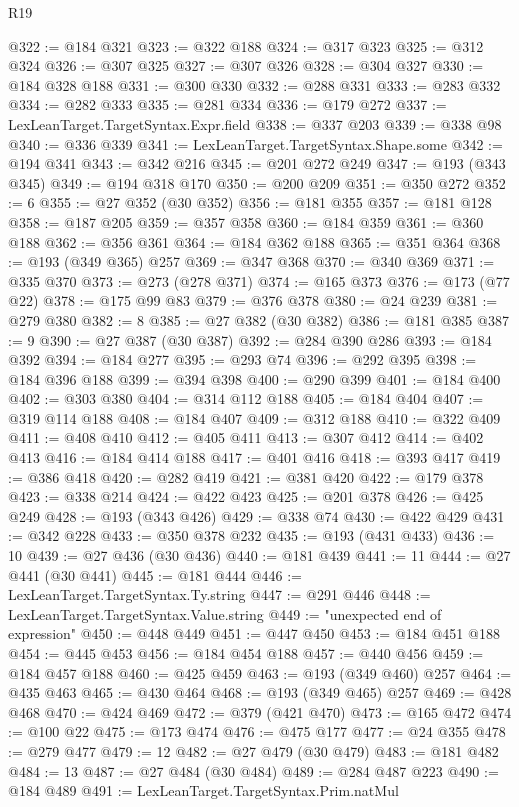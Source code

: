 \begin{lexlean}{R19}
\begin{coremodule}
@322 := @184 @321
@323 := @322 @188
@324 := @317 @323
@325 := @312 @324
@326 := @307 @325
@327 := @307 @326
@328 := @304 @327
@330 := @184 @328 @188
@331 := @300 @330
@332 := @288 @331
@333 := @283 @332
@334 := @282 @333
@335 := @281 @334
@336 := @179 @272
@337 := LexLeanTarget.TargetSyntax.Expr.field
@338 := @337 @203
@339 := @338 @98
@340 := @336 @339
@341 := LexLeanTarget.TargetSyntax.Shape.some
@342 := @194 @341
@343 := @342 @216
@345 := @201 @272 @249
@347 := @193 (@343 @345)
@349 := @194 @318 @170
@350 := @200 @209
@351 := @350 @272
@352 := 6
@355 := @27 @352 (@30 @352)
@356 := @181 @355
@357 := @181 @128
@358 := @187 @205
@359 := @357 @358
@360 := @184 @359
@361 := @360 @188
@362 := @356 @361
@364 := @184 @362 @188
@365 := @351 @364
@368 := @193 (@349 @365) @257
@369 := @347 @368
@370 := @340 @369
@371 := @335 @370
@373 := @273 (@278 @371)
@374 := @165 @373
@376 := @173 (@77 @22)
@378 := @175 @99 @83
@379 := @376 @378
@380 := @24 @239
@381 := @279 @380
@382 := 8
@385 := @27 @382 (@30 @382)
@386 := @181 @385
@387 := 9
@390 := @27 @387 (@30 @387)
@392 := @284 @390 @286
@393 := @184 @392
@394 := @184 @277
@395 := @293 @74
@396 := @292 @395
@398 := @184 @396 @188
@399 := @394 @398
@400 := @290 @399
@401 := @184 @400
@402 := @303 @380
@404 := @314 @112 @188
@405 := @184 @404
@407 := @319 @114 @188
@408 := @184 @407
@409 := @312 @188
@410 := @322 @409
@411 := @408 @410
@412 := @405 @411
@413 := @307 @412
@414 := @402 @413
@416 := @184 @414 @188
@417 := @401 @416
@418 := @393 @417
@419 := @386 @418
@420 := @282 @419
@421 := @381 @420
@422 := @179 @378
@423 := @338 @214
@424 := @422 @423
@425 := @201 @378
@426 := @425 @249
@428 := @193 (@343 @426)
@429 := @338 @74
@430 := @422 @429
@431 := @342 @228
@433 := @350 @378 @232
@435 := @193 (@431 @433)
@436 := 10
@439 := @27 @436 (@30 @436)
@440 := @181 @439
@441 := 11
@444 := @27 @441 (@30 @441)
@445 := @181 @444
@446 := LexLeanTarget.TargetSyntax.Ty.string
@447 := @291 @446
@448 := LexLeanTarget.TargetSyntax.Value.string
@449 := "unexpected end of expression"
@450 := @448 @449
@451 := @447 @450
@453 := @184 @451 @188
@454 := @445 @453
@456 := @184 @454 @188
@457 := @440 @456
@459 := @184 @457 @188
@460 := @425 @459
@463 := @193 (@349 @460) @257
@464 := @435 @463
@465 := @430 @464
@468 := @193 (@349 @465) @257
@469 := @428 @468
@470 := @424 @469
@472 := @379 (@421 @470)
@473 := @165 @472
@474 := @100 @22
@475 := @173 @474
@476 := @475 @177
@477 := @24 @355
@478 := @279 @477
@479 := 12
@482 := @27 @479 (@30 @479)
@483 := @181 @482
@484 := 13
@487 := @27 @484 (@30 @484)
@489 := @284 @487 @223
@490 := @184 @489
@491 := LexLeanTarget.TargetSyntax.Prim.natMul

\end{coremodule}
\end{lexlean}
